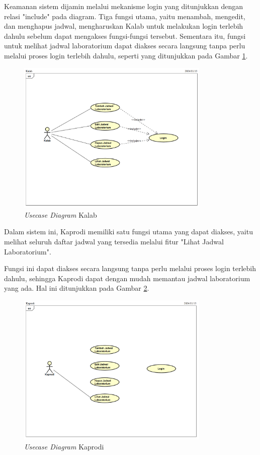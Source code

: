 Keamanan sistem dijamin melalui mekanisme login yang ditunjukkan dengan relasi "include" pada diagram. Tiga fungsi utama, yaitu menambah, mengedit, dan menghapus jadwal, mengharuskan Kalab untuk melakukan login terlebih dahulu sebelum dapat mengakses fungsi-fungsi tersebut. Sementara itu, fungsi untuk melihat jadwal laboratorium dapat diakses secara langsung tanpa perlu melalui proses login terlebih dahulu, seperti yang ditunjukkan pada Gambar \ref{usecase-diagram-kalab}.
\begin{figure}
	\centering
	\includegraphics[width=0.82\textwidth]{konten/gambar/usecase-diagram/kalab.png}
	\caption{\textit{Usecase Diagram} Kalab}
	\label{usecase-diagram-kalab}
\end{figure}

Dalam sistem ini, Kaprodi memiliki satu fungsi utama yang dapat diakses, yaitu melihat seluruh daftar jadwal yang tersedia melalui fitur "Lihat Jadwal Laboratorium".

Fungsi ini dapat diakses secara langsung tanpa perlu melalui proses login terlebih dahulu, sehingga Kaprodi dapat dengan mudah memantau jadwal laboratorium yang ada. Hal ini ditunjukkan pada Gambar \ref{usecase-diagram-kaprodi}.
\begin{figure}
	\centering
	\includegraphics[width=0.82\textwidth]{konten/gambar/usecase-diagram/kaprodi.png}
	\caption{\textit{Usecase Diagram} Kaprodi}
	\label{usecase-diagram-kaprodi}
\end{figure}

